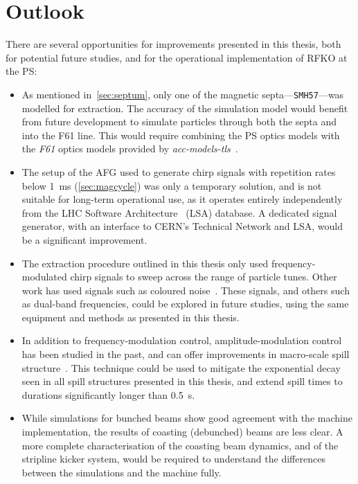 \documentclass[a4paper,twoside,11pt]{report}
\begin{document}
\section{Outlook}

There are several opportunities for improvements presented in this thesis, both for potential future studies, and for the operational implementation of RFKO at the PS:
\begin{itemize}
  \item As mentioned in~\autoref{sec:septum}, only one of the magnetic septa---\verb|SMH57|---was modelled for extraction. The accuracy of the simulation model would benefit from future development to simulate particles through both the septa and into the F61 line. This would require combining the PS optics models with the \textit{F61} optics models provided by \textit{acc-models-tls}~\cite{optics_repo}.
  \item The setup of the AFG used to generate chirp signals with repetition rates below \qty{1}{\milli\second} (\autoref{sec:magcycle}) was only a temporary solution, and is not suitable for long-term operational use, as it operates entirely independently from the LHC Software Architecture~\cite{Roderick:1215575} (LSA) database. A dedicated signal generator, with an interface to CERN's Technical Network and LSA, would be a significant improvement.
  \item The extraction procedure outlined in this thesis only used frequency-modulated chirp signals to sweep across the range of particle tunes. Other work has used signals such as coloured noise~\cite{Nagaslaev:2011zz}. These signals, and others such as dual-band frequencies, could be explored in future studies, using the same equipment and methods as presented in this thesis.
  \item In addition to frequency-modulation control, amplitude-modulation control has been studied in the past, and can offer improvements in macro-scale spill structure~\cite{NODA2002241}. This technique could be used to mitigate the exponential decay seen in all spill structures presented in this thesis, and extend spill times to durations significantly longer than \qty{0.5}{\second}.
  \item While simulations for bunched beams show good agreement with the machine implementation, the results of coasting (debunched) beams are less clear. A more complete characterisation of the coasting beam dynamics, and of the stripline kicker system, would be required to understand the differences between the simulations and the machine fully.
\end{itemize}
\end{document}
